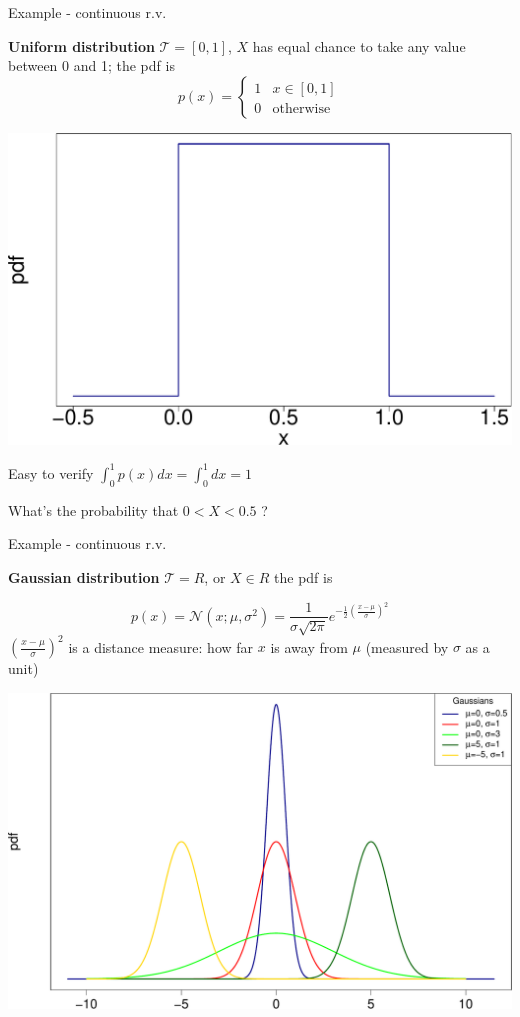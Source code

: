 \documentclass[ignorenonframetext,]{beamer}
\newcommand{\normal}[2]{\ensuremath{\mathcal{N}\left (#1,#2 \right )}}
\begin{document}
\begin{frame}{Example - continuous r.v.}
\protect\hypertarget{example---continuous-r.v.}{}

\textbf{Uniform distribution} \(\mathcal{T} = [0,1]\), \(X\) has equal
chance to take any value between 0 and 1; the pdf is
\[p(x) = \begin{cases} 1 & x\in [0,1] \\
0 & \text{otherwise} \end{cases} \]

\begin{center}\includegraphics[width=0.5\linewidth]{math4ml_files/figure-beamer/unnamed-chunk-10-1} \end{center}

Easy to verify \(\int_0^1 p(x)dx = \int_0^1 dx =1\) \bigskip

What's the probability that \(0<X<0.5\) ?

\end{frame}

\begin{frame}{Example - continuous r.v.}
\protect\hypertarget{example---continuous-r.v.-1}{}

\textbf{Gaussian distribution} \(\mathcal{T} = R\), or \(X \in R\) the
pdf is

\[p(x) = \normal{x; \mu}{\sigma^2}=\frac{1}{\sigma \sqrt{2\pi}} e^{-\frac{1}{2}(\frac{x-\mu}{\sigma})^2}\]
\((\frac{x-\mu}{\sigma})^2\) is a distance measure: how far \(x\) is
away from \(\mu\) (measured by \(\sigma\) as a unit)

\begin{center}\includegraphics[width=0.75\linewidth]{math4ml_files/figure-beamer/unnamed-chunk-11-1} \end{center}

\end{frame}
\end{document}
